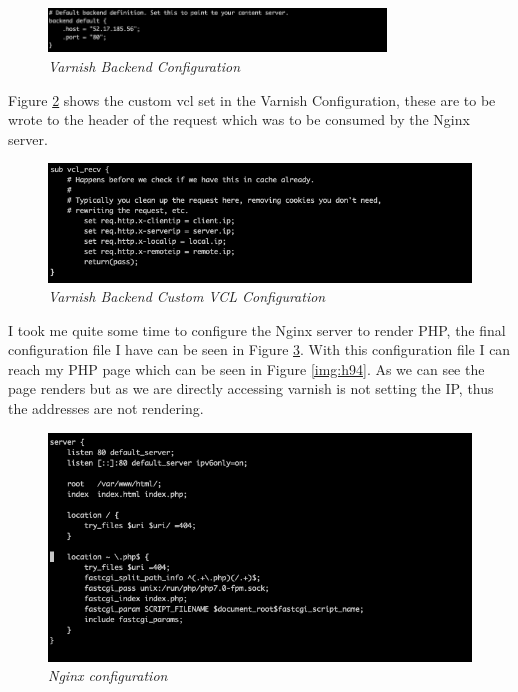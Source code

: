\begin{figure}[!hb]
\centering
\includegraphics*[width=0.8\textwidth]{images/h8.png}
\caption{\em Varnish Backend Configuration}
\label{img:h8}
\end{figure}

Figure \ref{img:h9} shows the custom vcl set in the Varnish Configuration, these are to be wrote to the header of the request which was to be consumed by the Nginx server.
\begin{figure}[!hb]
\centering
\includegraphics*[width=1\textwidth]{images/h9.png}
\caption{\em Varnish Backend Custom VCL Configuration}
\label{img:h9}
\end{figure}

I took me quite some time to configure the Nginx server to render PHP, the final configuration file I have can be seen in Figure \ref{img:h91}. With this configuration file I can reach my PHP page which can be seen in Figure \ref{img:h94}. As we can see the page renders but as we are directly accessing varnish is not setting the IP, thus the addresses are not rendering.

\begin{figure}[!hb]
\centering
\includegraphics*[width=1\textwidth]{images/h91.png}
\caption{\em Nginx configuration}
\label{img:h91}
\end{figure}

